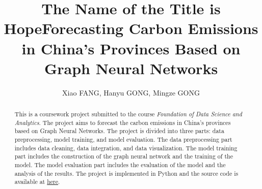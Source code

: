 \documentclass[sigconf, authordraft]{acmart}
\begin{document}
\title{The Name of the Title is Hope}
\title{Forecasting Carbon Emissions in China's Provinces Based on Graph Neural Networks}



\author{Xiao FANG, Hanyu GONG, Mingze GONG}


\renewcommand{\shortauthors}{Xiao, Hanyu \& Mingze}


\begin{abstract}
	This is a coursework project submitted to the course \textit{Foundation of Data
		Science and Analytics}. The project aims to forecast the carbon emissions in
	China's provinces based on Graph Neural Networks. The project is divided
	into three parts: data preprocessing, model training, and model evaluation.
	The data preprocessing part includes data cleaning, data integration, and
	data visualization. The model training part includes the construction of the
	graph neural network and the training of the model. The model evaluation
	part includes the evaluation of the model and the analysis of the results. The
	project is implemented in Python and the source code is available at \href{https://github.com/palaceparis/DSAA5020_Group_Project}{here}.
\end{abstract}


\end{document}
